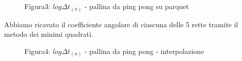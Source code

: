 \documentclass[a4paper]{article}
\theoremstyle{definition}
\begin{document}
	\begin{figure}[!ht]
		\captionsetup{labelformat=empty}
		\caption{Figura3: \(log\Delta t _{(n)}\) - pallina da ping pong su parquet}
	\end{figure}
	
	\noindent Abbiamo ricavato il coefficiente angolare di ciascuna delle 5 rette tramite il metodo dei minimi quadrati.
	
	\begin{figure}[!ht]
		\captionsetup{labelformat=empty}
		\caption{ Figura4: \(log\Delta t _{(n)}\) - pallina da ping pong - interpolazione}
	\end{figure}
	
\end{document}
